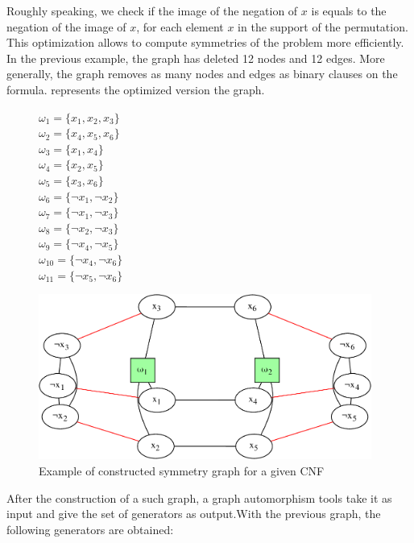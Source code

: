 Roughly speaking, we check if the image of the negation of $x$ is equals to the negation of the image of $x$,
for each element $x$ in the support of the permutation.
This optimization allows to compute symmetries of the problem more efficiently.
In the previous example, the graph has deleted 12 nodes and 12 edges. More generally,
the graph removes as many nodes and edges as binary clauses on the formula.
 represents the optimized version the graph.
\begin{figure}[!htbp]
 \begin{minipage}[r]{.2\textwidth}
   $\omega_{1} = \{ x_{1}, x_{2}, x_{3} \}$ \\
 $\omega_{2} = \{ x_{4}, x_{5}, x_{6} \}$ \\
 $\omega_{3} = \{ x_{1}, x_{4} \}$ \\
 $\omega_{4} = \{ x_{2}, x_{5} \}$ \\
 $\omega_{5} = \{ x_{3}, x_{6} \}$ \\
 $\omega_{6} = \{ \neg x_{1}, \neg x_{2} \}$ \\
 $\omega_{7} = \{ \neg x_{1}, \neg x_{3} \}$ \\
 $\omega_{8} = \{ \neg x_{2}, \neg x_{3} \}$ \\
 $\omega_{9} = \{ \neg x_{4}, \neg x_{5} \}$ \\
 $\omega_{10} = \{ \neg x_{4}, \neg x_{6} \}$ \\
 $\omega_{11} = \{ \neg x_{5}, \neg x_{6} \}$ \\
 \end{minipage}
 \begin{minipage}[r]{.75\textwidth}
  \includegraphics[width=4.3in]{cnfs/graph_cnf_opt-crop}
 \end{minipage}
 \caption{Example of constructed symmetry graph for a given CNF}
  \label{fig:graph_opt}
\end{figure}


After the construction of a such graph, a graph automorphism tools take it as input and give
the set of generators as output.With the previous graph, the following generators are obtained:


